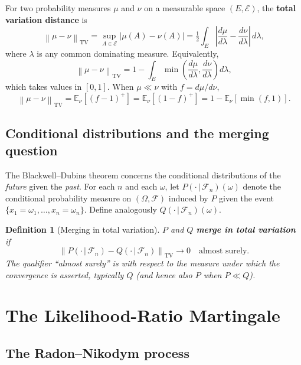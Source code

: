\documentclass[12pt]{article}
\newtheorem{definition}[theorem]{Definition}
\newcommand{\abs}[1]{\left|#1\right|}
\newcommand{\E}{\mathbb{E}}
\newcommand{\TV}[1]{\left\|#1\right\|_{\mathrm{TV}}}
\begin{document}
For two probability measures $\mu$ and $\nu$ on a measurable space
$(E, \mathscr{E})$, the \textbf{total variation distance} is
\[
\TV{\mu - \nu}
= \sup_{A \in \mathscr{E}}\abs{\mu(A) - \nu(A)}
= \tfrac{1}{2}\int_E \abs{\frac{d\mu}{d\lambda} - \frac{d\nu}{d\lambda}}\, d\lambda,
\]
where $\lambda$ is any common dominating measure.  Equivalently,
\begin{equation}
\label{eq:TV-formula}
\TV{\mu - \nu} = 1 - \int_E \min\!\left(\frac{d\mu}{d\lambda},
  \frac{d\nu}{d\lambda}\right) d\lambda,
\end{equation}
which takes values in $[0, 1]$.  When $\mu \ll \nu$ with $f = d\mu/d\nu$,
\begin{equation}
\label{eq:TV-RN}
\TV{\mu - \nu} = \E_\nu[(f - 1)^+] = \E_\nu[(1 - f)^+]
= 1 - \E_\nu[\min(f, 1)].
\end{equation}

\subsection{Conditional distributions and the merging question}

The Blackwell--Dubins theorem concerns the conditional distributions of the
\emph{future} given the \emph{past}.  For each $n$ and each $\omega$, let
$P(\cdot\,|\,\mathscr{F}_n)(\omega)$ denote the conditional probability
measure on $(\Omega, \mathscr{F})$ induced by $P$ given the event
$\{x_1 = \omega_1, \ldots, x_n = \omega_n\}$.  Define analogously
$Q(\cdot\,|\,\mathscr{F}_n)(\omega)$.

\begin{definition}[Merging in total variation]
$P$ and $Q$ \textbf{merge in total variation} if
\[
\TV{P(\cdot\,|\,\mathscr{F}_n) - Q(\cdot\,|\,\mathscr{F}_n)} \to 0
\quad \text{almost surely.}
\]
The qualifier ``almost surely'' is with respect to the measure under which
the convergence is asserted, typically $Q$ (and hence also $P$ when $P \ll Q$).
\end{definition}

\section{The Likelihood-Ratio Martingale}
\label{sec:RN}

\subsection{The Radon--Nikodym process}
\end{document}
